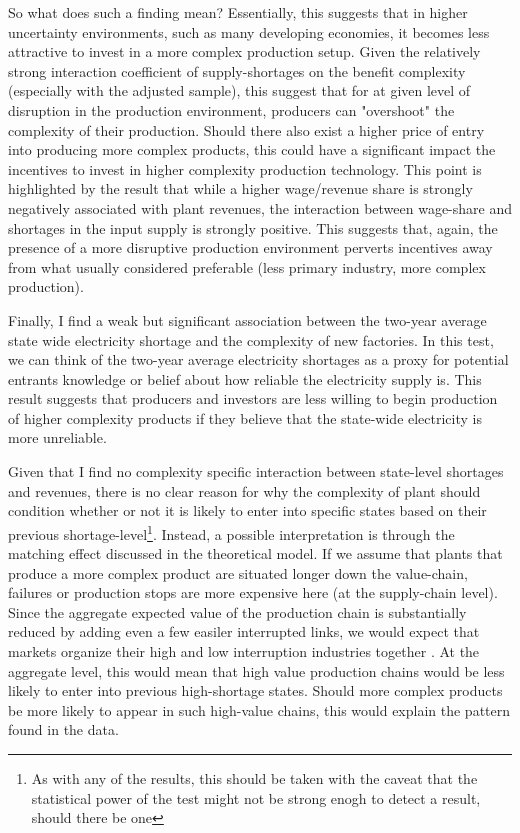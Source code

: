 \documentclass[11pt]{article}
\begin{document}
So what does such a finding mean? Essentially, this suggests that in higher uncertainty environments, such as many developing economies, it becomes less attractive to invest in a more complex production setup. Given the relatively strong interaction coefficient of supply-shortages on the benefit complexity (especially with the adjusted sample), this suggest that for at given level of disruption in the production environment, producers can "overshoot" the complexity of their production. Should there also exist a higher price of entry into producing more complex products, this could have a significant impact the incentives to invest in higher complexity production technology. This point is highlighted by the result that while a higher wage/revenue share is strongly negatively associated with plant revenues, the interaction between wage-share and shortages in the input supply is strongly positive. This suggests that, again, the presence of a more disruptive production environment perverts incentives away from what usually considered preferable (less primary industry, more complex production). 

Finally, I find a weak but significant association between the two-year average state wide electricity shortage and the complexity of new factories. In this test, we can think of the two-year average electricity shortages as a proxy for potential entrants knowledge or belief about how reliable the electricity supply is. This result suggests that producers and investors are less willing to begin production of higher complexity products if they believe that the state-wide electricity is more unreliable.

Given that I find no complexity specific interaction between state-level shortages and revenues, there is no clear reason for why the complexity of plant should condition whether or not it is likely to enter into specific states based on their previous shortage-level\footnote{As with any of the results, this should be taken with the caveat that the statistical power of the test might not be strong enogh to detect a result, should there be one}. Instead, a possible interpretation is through the matching effect discussed in the theoretical model. If we assume that plants that produce a more complex product are situated longer down the value-chain, failures or production stops are more expensive here (at the supply-chain level). Since the aggregate expected value of the production chain is substantially reduced by adding even a few easiler interrupted links, we would expect that markets organize their high and low interruption industries together \citep{kremer_o-ring_1993}. At the aggregate level, this would mean that high value production chains would be less likely to enter into previous high-shortage states. Should more complex products be more likely to appear in such high-value chains, this would explain the pattern found in the data.
\end{document}
